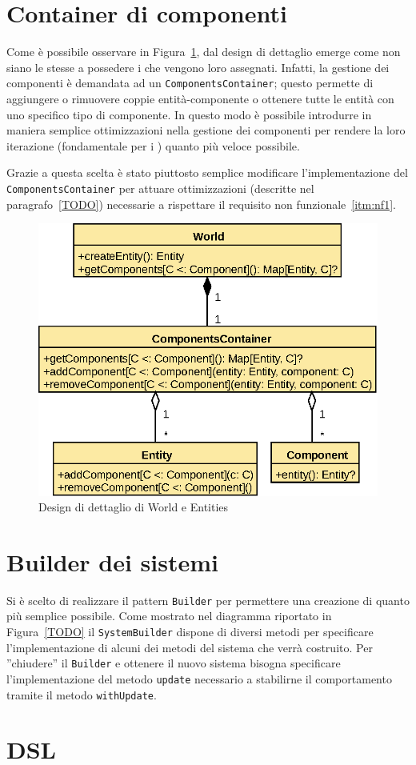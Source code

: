

\section{Container di componenti}\label{sec:container-di-componenti}
Come è possibile osservare in Figura~\ref{fig:world-detail}, dal design di dettaglio emerge come
non siano le \Entity stesse a possedere i \Component che vengono loro assegnati.
Infatti, la gestione dei componenti è demandata ad un \texttt{ComponentsContainer}; questo permette
di aggiungere o rimuovere coppie entità-componente o ottenere tutte le entità con uno specifico tipo
di componente.
In questo modo è possibile introdurre in maniera semplice ottimizzazioni nella gestione dei
componenti per rendere la loro iterazione (fondamentale per i \System) quanto più veloce possibile.

Grazie a questa scelta è stato piuttosto semplice modificare l'implementazione del
\texttt{ComponentsContainer} per attuare ottimizzazioni (descritte nel paragrafo~\ref{TODO})
necessarie a rispettare il requisito non funzionale~\ref{itm:nf1}.
\begin{figure}
    \includegraphics{./img/WorldDetail}
    \caption{Design di dettaglio di World e Entities}
    \label{fig:world-detail}
\end{figure}

\section{Builder dei sistemi}\label{sec:builder-dei-sistemi}
Si è scelto di realizzare il pattern \texttt{Builder} per permettere una creazione di \System
quanto più semplice possibile.
Come mostrato nel diagramma riportato in Figura~\ref{TODO} il \texttt{SystemBuilder} dispone di diversi metodi per
specificare l'implementazione di alcuni dei metodi del sistema che verrà costruito.
Per ''chiudere'' il \texttt{Builder} e ottenere il nuovo sistema bisogna specificare
l'implementazione del metodo \texttt{update} necessario a stabilirne il comportamento tramite il metodo
\texttt{withUpdate}.

\section{DSL}\label{sec:dsl}
